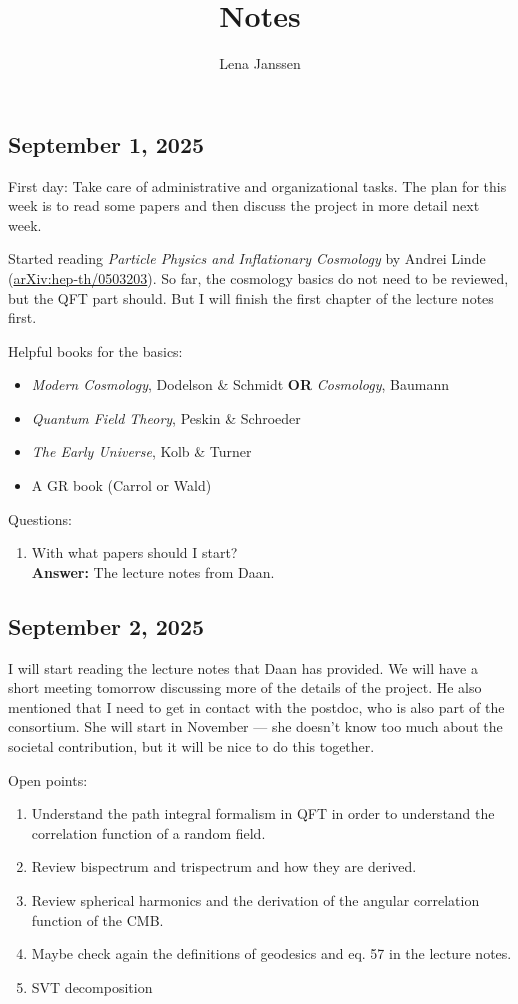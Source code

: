 \documentclass[12pt]{article}
\title{Notes}
\author{Lena Janssen}
\date{}
\newcommand{\cmark}{\textcolor{green}{\ding{51}}}
\newcommand{\xmark}{\textcolor{red}{\ding{55}}}
\begin{document}
\maketitle

\subsection*{September 1, 2025}
First day: Take care of administrative and organizational tasks. The plan for this week is to read some papers and then discuss the project in more detail next week.

Started reading \textit{Particle Physics and Inflationary Cosmology} by Andrei Linde (\href{https://arxiv.org/abs/hep-th/0503203}{arXiv:hep-th/0503203}). So far, the cosmology basics do not need to be reviewed, but the QFT part should. But I will finish the first chapter of the lecture notes first. 

Helpful books for the basics:
\begin{itemize}
    \item \textit{Modern Cosmology}, Dodelson \& Schmidt \textbf{OR} \textit{Cosmology}, Baumann
    \item \textit{Quantum Field Theory}, Peskin \& Schroeder
    \item \textit{The Early Universe}, Kolb \& Turner
    \item A GR book (Carrol or Wald)
\end{itemize}

Questions:
\begin{enumerate}
    \item With what papers should I start? \cmark\\ 
    \textbf{Answer:} The lecture notes from Daan.
\end{enumerate}

\subsection*{September 2, 2025}
I will start reading the lecture notes that Daan has provided. We will have a short meeting tomorrow discussing more of the details of the project. He also mentioned that I need to get in contact with the postdoc, who is also part of the consortium. She will start in November — she doesn't know too much about the societal contribution, but it will be nice to do this together.

Open points:
\begin{enumerate}
    \item Understand the path integral formalism in QFT in order to understand the correlation function of a random field. \xmark
    \item Review bispectrum and trispectrum and how they are derived. \xmark
    \item Review spherical harmonics and the derivation of the angular correlation function of the CMB. \xmark
    \item Maybe check again the definitions of geodesics and eq. 57 in the lecture notes. \xmark
    \item SVT decomposition \xmark
\end{enumerate}
\end{document}
